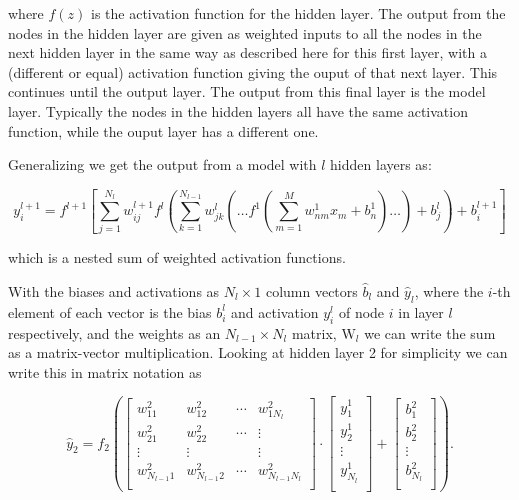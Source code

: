 \documentclass[11pt]{article}
\begin{document}
where \(f(z)\) is the activation function for the hidden layer. The
output from the nodes in the hidden layer are given as weighted inputs
to all the nodes in the next hidden layer in the same way as described
here for this first layer, with a (different or equal) activation
function giving the ouput of that next layer. This continues until the
output layer. The output from this final layer is the model layer.
Typically the nodes in the hidden layers all have the same activation
function, while the ouput layer has a different one.

Generalizing we get the output from a model with \(l\) hidden layers as:


\begin{equation}
y^{l+1}_i = f^{l+1}\left[\!\sum_{j=1}^{N_l} w_{ij}^{l+1} f^l\left(\sum_{k=1}^{N_{l-1}}w_{jk}^{l}\left(\dots f^1\left(\sum_{m=1}^{M} w_{nm}^1 x_m+ b_n^1\right)\dots\right)+b_j^{l}\right)+b_i^{l+1}\right] 
\end{equation}


which is a nested sum of weighted activation functions.

With the biases and activations as \(N_l \times 1\) column vectors
\(\hat{b}_l\) and \(\hat{y}_l\), where the \(i\)-th element of each
vector is the bias \(b_i^l\) and activation \(y_i^l\) of node \(i\) in
layer \(l\) respectively, and the weights as an \(N_{l-1} \times N_l\)
matrix, \(\mathrm{W}_l\) we can write the sum as a matrix-vector
multiplication. Looking at hidden layer 2 for simplicity we can write
this in matrix notation as


\begin{equation}
 \hat{y}_2 =  
 f_2\left(\left[\begin{array}{cccc}
    w^2_{11} &w^2_{12}  &\cdots &w^2_{1N_l} \\
    w^2_{21} &w^2_{22} &\cdots &\vdots \\
    \vdots   &\vdots   &       &\vdots \\
    w^2_{N_{l-1}1} &w^2_{N_{l-1}2} &\cdots &w^2_{N_{l-1}N_l} \\
    \end{array} \right] \cdot
    \left[\begin{array}{c}
           y^1_1 \\
           y^1_2 \\
           \vdots \\
           y^1_{N_l} \\
          \end{array}\right] + 
    \left[\begin{array}{c}
           b^2_1 \\
           b^2_2 \\
           \vdots \\
           b^2_{N_l} \\
          \end{array}\right]\right).
\end{equation}
\end{document}

